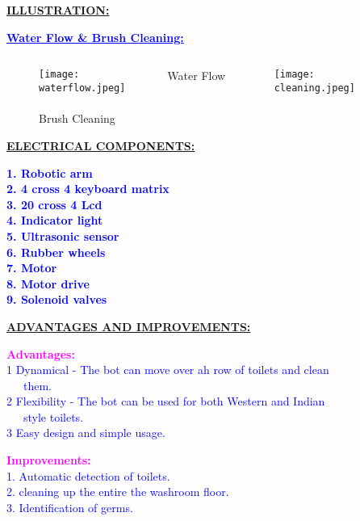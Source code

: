 \documentclass{beamer}
\begin{document}
\begin{frame}
{\underline{\textbf{ILLUSTRATION:}}}

\textbf{\textcolor{blue}{\underline{Water Flow \& Brush Cleaning:}}}
\begin{figure}\begin{columns}


\texttt{[image: waterflow.jpeg]}
\caption{ Water Flow  \   \   \    \    \   \   \    \    }

\texttt{[image: cleaning.jpeg]}
\caption{Brush Cleaning  \   \   \   \    \    \   \   \    \    }
\end{columns}
\end{figure}

\end{frame}


\begin{frame}{\underline{\textbf{ELECTRICAL COMPONENTS:}}}

\textbf{\textcolor{blue}{1. Robotic arm\\
2. 4 cross 4 keyboard matrix\\
3. 20 cross 4 Lcd \\
4. Indicator light\\
5. Ultrasonic sensor\\
6. Rubber wheels\\
7. Motor\\
8. Motor drive\\
9. Solenoid valves
}}
\end{frame}

\begin{frame}{\underline{\textbf{ADVANTAGES AND IMPROVEMENTS:}}}



\textbf{\textcolor{magenta}{Advantages:\\}}
\textcolor{blue}{1 Dynamical - The bot can move over ah row of toilets and clean\\  \   \  \   them.\\
2 Flexibility -  The bot can be used for both Western and Indian\\    \   \  \  
 style toilets.\\
3 Easy design and simple usage.\\}



\textbf{\textcolor{magenta}{Improvements:\\}}
\textcolor{blue}{
1. Automatic detection of toilets.\\
2. cleaning up the entire the washroom floor.\\
3. Identification of germs.}

\end{frame}
\end{document}
